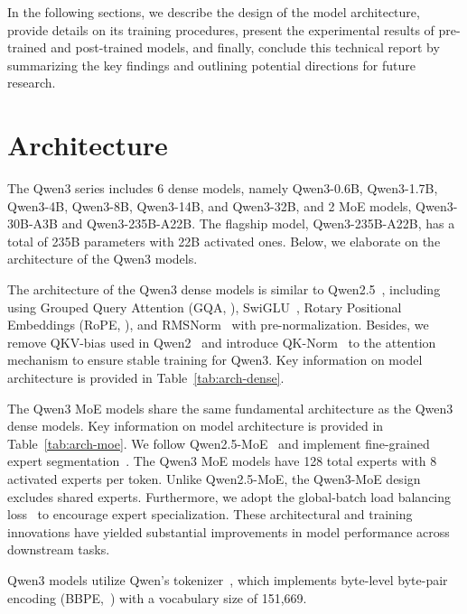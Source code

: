 \documentclass[dvipsnames]{article}
\begin{document}
In the following sections, we describe the design of the model architecture, provide details on its training procedures, present the experimental results of pre-trained and post-trained models, and finally, conclude this technical report by summarizing the key findings and outlining potential directions for future research.
\section{Architecture}

The Qwen3 series includes 6 dense models, namely Qwen3-0.6B, Qwen3-1.7B, Qwen3-4B, Qwen3-8B, Qwen3-14B, and Qwen3-32B, and 2 MoE models, Qwen3-30B-A3B and Qwen3-235B-A22B. The flagship model, Qwen3-235B-A22B, has a total of 235B parameters with 22B activated ones. Below, we elaborate on the architecture of the Qwen3 models.

The architecture of the Qwen3 dense models is similar to Qwen2.5~\citep{qwen2.5}, including using Grouped Query Attention (GQA, \citealp{gqa}), SwiGLU~\citep{glu}, Rotary Positional Embeddings (RoPE, \citealp{rope}), and RMSNorm~\citep{rmsnorm} with pre-normalization. Besides, we remove QKV-bias used in Qwen2~\citep{qwen2} and introduce QK-Norm~\citep{pmlr-v202-dehghani23a} to the attention mechanism to ensure stable training for Qwen3. Key information on model architecture is provided in Table~\ref{tab:arch-dense}.

The Qwen3 MoE models share the same fundamental architecture as the Qwen3 dense models. 
Key information on model architecture is provided in Table~\ref{tab:arch-moe}. 
We follow Qwen2.5-MoE~\citep{qwen2.5} and implement fine-grained expert segmentation~\citep{deepseekmoe}. 
The Qwen3 MoE models have 128 total experts with 8 activated experts per token.
Unlike Qwen2.5-MoE, the Qwen3-MoE design excludes shared experts.
Furthermore, we adopt the global-batch load balancing loss~\citep{global_balance} to encourage expert specialization.
These architectural and training innovations have yielded substantial improvements in model performance across downstream tasks. 

Qwen3 models utilize Qwen's tokenizer~\citep{qwen}, which implements byte-level byte-pair encoding (BBPE,~\citealp{gpt3,wang2020neural,sennirch2016neural}) with a vocabulary size of 151,669.
\end{document}
